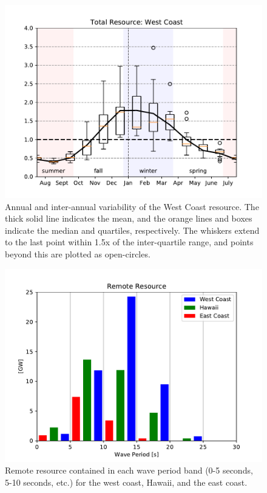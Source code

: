 \begin{figure}[ht]
  \centering
  \includegraphics[width=\textwidth]{../fig/AnnualVar01.wc.pdf}
  \caption[West Coast resource variability.]{Annual and inter-annual variability of the West Coast resource. The thick solid line indicates the mean, and the orange lines and boxes indicate the median and quartiles, respectively. The whiskers extend to the last point within 1.5x of the inter-quartile range, and points beyond this are plotted as open-circles.}
  \label{fig:wc-variability}
\end{figure}

\begin{figure}[ht]
  \centering
  \includegraphics[width=\linewidth]{../fig/RemoteResource_Freq01.pdf}
  \caption{Remote resource contained in each wave period band (0-5 seconds, 5-10 seconds, etc.) for the west coast, Hawaii, and the east coast.}
  \label{fig:remote-freq}
\end{figure}

